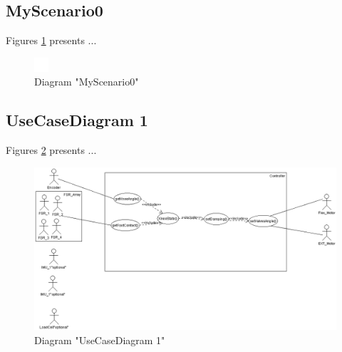 \subsection{MyScenario0}
Figures \ref{fig:MyScenario0MyScenario012} presents ...
\begin{figure}[htb]
\centering
\includegraphics[width=\textwidth]{img_1_2.png}
\caption{Diagram "MyScenario0"}
\label{fig:MyScenario0MyScenario012}
\end{figure}

\subsection{UseCaseDiagram 1}
Figures \ref{fig:UseCaseDiagram 1UseCaseDiagram 113} presents ...
\begin{figure}[htb]
\centering
\includegraphics[width=\textwidth]{img_1_3.png}
\caption{Diagram "UseCaseDiagram 1"}
\label{fig:UseCaseDiagram 1UseCaseDiagram 113}
\end{figure}

